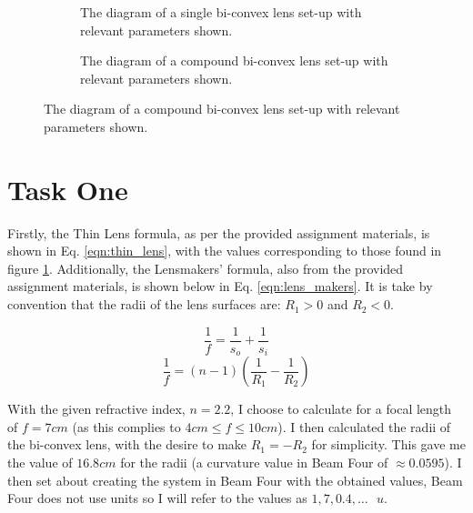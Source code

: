 \documentclass[colorlinks,11pt,a4paper,normalphoto,withhyper,ragged2e]{altareport}
\begin{document}
		
		
		
		\begin{figure}[h]
			\centering
			\begin{subfigure}{0.47\linewidth}
				\centering
				
				\caption{\centering\footnotesize The diagram of a single bi-convex lens set-up with relevant parameters shown.}
				\label{fig:lens_single}
			\end{subfigure}
			\hfill
			\begin{subfigure}{0.47\linewidth}
				\centering
				
				\caption{\centering\footnotesize The diagram of a compound bi-convex lens set-up with relevant parameters shown.}
				\label{fig:lens_compound}
			\end{subfigure}
		\end{figure}
		
		
		
		
	\section{Task One}
		Firstly, the Thin Lens formula, as per the provided assignment materials, is shown in Eq. \ref{eqn:thin_lens}, with the values corresponding to those found in figure \ref{fig:lens_single}. Additionally, the Lensmakers' formula, also from the provided assignment materials, is shown below in Eq. \ref{eqn:lens_makers}. It is take by convention that the radii of the lens surfaces are: $R_1>0$ and $R_2<0$. \linebreak
		
		\begin{paracol}{2}
			\begin{equation}
				\frac{1}{f} = \frac{1}{s_o} + \frac{1}{s_i}
			\end{equation}\label{eqn:thin_lens}
			\begin{equation}
				\frac{1}{f} = (n-1) \left( \frac{1}{R_1} - \frac{1}{R_2} \right)
			\end{equation}\label{eqn:lens_makers}
			
			\switchcolumn
			
			With the given refractive index, $n=2.2$, I choose to calculate for a focal length of $f=7cm$ (as this complies to $4cm \leq f \leq 10cm$). I then calculated the radii of the bi-convex lens, with the desire to make $R_1=-R_2$ for simplicity. This gave me the value of $16.8cm$ for the radii (a curvature value in Beam Four of $\approx 0.0595$). \linebreak
			I then set about creating the system in Beam Four with the obtained values, Beam Four does not use units so I will refer to the values as $1,7,0.4, \dots \text{ } u$.
		\end{paracol}
		
\end{document}
